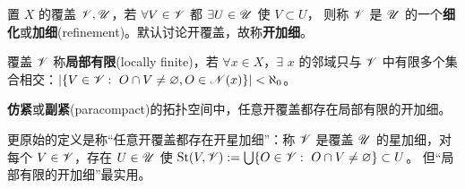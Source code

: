 \begin{definition}
置 $X$ 的覆盖 $\mathscr V,\mathscr U$，若 $\forall V\in\mathscr V$ 都 $\exists U\in\mathscr U$ 使 $V\subset U$，
则称 $\mathscr V$ 是 $\mathscr U$ 的一个\textbf{细化}或\textbf{加细}(refinement)。默认讨论开覆盖，故称\textbf{开加细}。
\end{definition}

\begin{definition}
覆盖 $\mathscr V$ 称\textbf{局部有限}(locally finite)，若 $\forall x\in X$，$\exists$ $x$ 的邻域只与 $\mathscr V$ 中有限多个集合相交：$|\{V\in\mathscr V:\ O\cap V\ne\varnothing, O\in\mathscr N(x)\}|<\aleph_0$。
\end{definition}


\begin{definition}
    \textbf{仿紧}或\textbf{副紧}(paracompact)的拓扑空间中，任意开覆盖都存在局部有限的开加细。
\end{definition}
\begin{remark}
    更原始的定义是称“任意开覆盖都存在开星加细”：称 $\mathscr V$ 是覆盖 $\mathscr U$ 的星加细，对每个 $V\in\mathscr V$，存在 $U\in\mathscr U$ 使 $\operatorname{St}(V,\mathscr V):=\bigcup\{O\in\mathscr V:\ O\cap V\ne\varnothing\}\subset U$。
    但“局部有限的开加细”最实用。
\end{remark}

